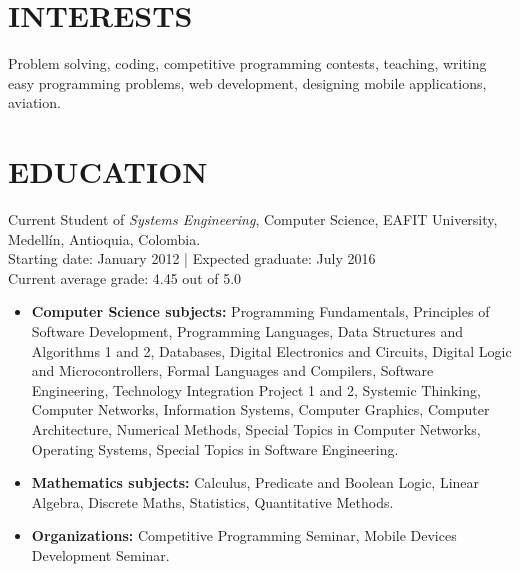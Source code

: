 \documentclass[margin, 10pt]{res} %
\begin{document}
\begin{resume}


\section{INTERESTS}

Problem solving, coding, competitive programming contests, teaching, writing easy programming
problems, web development, designing mobile applications, aviation.


\section{EDUCATION}

Current Student of {\sl Systems Engineering}, Computer Science, EAFIT University, Medellín,
Antioquia, Colombia. \\
Starting date: January 2012 | Expected graduate: July 2016 \\
Current average grade: 4.45 out of 5.0
\begin{itemize}
  \item \textbf{Computer Science subjects:} Programming Fundamentals, Principles of Software
                Development, Programming Languages, Data Structures and Algorithms 1 and 2,
                Databases, Digital Electronics and Circuits, Digital Logic and Microcontrollers,
                Formal Languages and Compilers, Software Engineering,
                Technology Integration Project 1 and 2, Systemic Thinking, Computer Networks,
                Information Systems, Computer Graphics, Computer Architecture, Numerical Methods,
                Special Topics in Computer Networks, Operating Systems, Special Topics in Software
                Engineering.
  \item \textbf{Mathematics subjects:} Calculus, Predicate and Boolean Logic, Linear Algebra,
                                       Discrete Maths, Statistics, Quantitative Methods.
  \item \textbf{Organizations:} Competitive Programming Seminar, Mobile Devices Development Seminar.
\end{itemize}


\end{resume}
\end{document}
